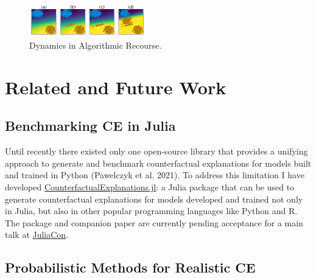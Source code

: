 \documentclass[
  sigconf]{acmart}
\begin{document}
\begin{figure}

{\centering \includegraphics[width=0.45\textwidth,height=\textheight]{www/poc.png}

}

\caption{\label{fig-dynamics}Dynamics in Algorithmic Recourse.}

\end{figure}

\hypertarget{sec-related}{%
\section{Related and Future Work}\label{sec-related}}

\hypertarget{benchmarking-ce-in-julia}{%
\subsection{Benchmarking CE in Julia}\label{benchmarking-ce-in-julia}}

Until recently there existed only one open-source library that provides
a unifying approach to generate and benchmark counterfactual
explanations for models built and trained in Python (Pawelczyk et al.
2021). To address this limitation I have developed
\href{https://www.paltmeyer.com/CounterfactualExplanations.jl/stable/}{CounterfactualExplanations.jl}:
a Julia package that can be used to generate counterfactual explanations
for models developed and trained not only in Julia, but also in other
popular programming languages like Python and R. The package and
companion paper are currently pending acceptance for a main talk at
\href{https://juliacon.org/2022/}{JuliaCon}.

\hypertarget{probabilistic-methods-for-realistic-ce}{%
\subsection{Probabilistic Methods for Realistic
CE}\label{probabilistic-methods-for-realistic-ce}}
\end{document}
